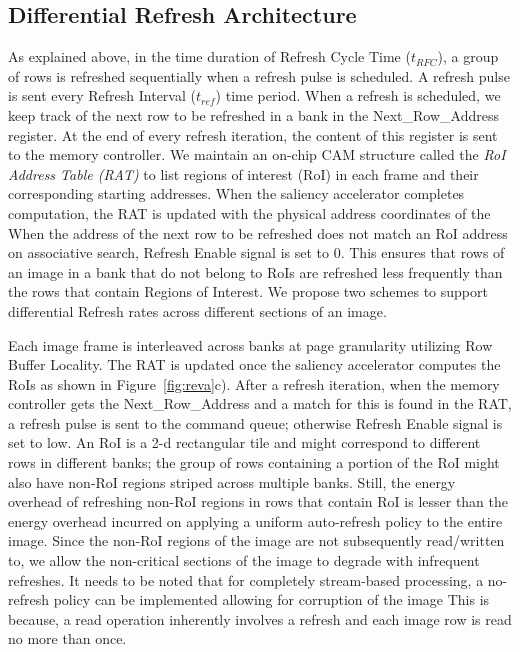 \subsection{Differential Refresh Architecture}
As explained above, in the time duration of Refresh Cycle Time ($t_{RFC}$), a group of rows is refreshed sequentially when a refresh pulse is scheduled. A refresh pulse is sent every Refresh Interval ($t_{ref}$) time period.  When a refresh is scheduled, we keep track of the next row to be refreshed in a bank in the Next\_Row\_Address register. At the end of every refresh iteration, the content of this register is sent to the memory controller. We maintain an on-chip CAM structure called the \emph{RoI Address Table (RAT)} to list regions of interest (RoI) in each frame and their corresponding starting addresses. When the saliency accelerator completes computation, the RAT is updated with the physical address coordinates of the  When the address of the next row to be refreshed does not match an RoI address on associative search, Refresh Enable signal is set to 0. This ensures that rows of an image in a bank that do not belong to RoIs are refreshed less frequently than the rows that contain Regions of Interest. We propose two schemes to support differential Refresh rates across different sections of an image. 

Each image frame is interleaved across banks at page granularity utilizing Row Buffer Locality. The RAT is updated once the saliency accelerator computes the RoIs as shown in Figure~\ref{fig:reva}c). After a refresh iteration, when the memory controller gets the Next\_Row\_Address and a match for this is found in the RAT, a refresh pulse is sent to the command queue; otherwise Refresh Enable signal is set to low. An RoI is a 2-d rectangular tile and might correspond to different rows in different banks; the group of rows containing a portion of the RoI might also have non-RoI regions striped across multiple banks. Still, the energy overhead of refreshing non-RoI regions in rows that contain RoI is lesser than the energy overhead incurred on applying a uniform auto-refresh policy to the entire image. Since the non-RoI regions of the image are not subsequently read/written to, we allow the non-critical sections of the image to degrade with infrequent refreshes. It needs to be noted that for completely stream-based processing, a no-refresh policy can be implemented allowing for corruption of the image
This is because, a read operation inherently involves a refresh and each image row is read no more than once.
 
